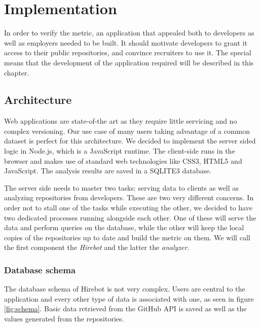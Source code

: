 \chapter{Implementation}\label{ch:implementation}
In order to verify the metric, an application that appealed both to developers as well as employers needed to be built. It should motivate developers to grant it access to their public repositories, and convince recruiters to use it. The special means that the development of the application required will be described in this chapter.

\section{Architecture}
Web applications are state-of-the art as they require little servicing and no complex versioning. Our use case of many users taking advantage of a common dataset is perfect for this architecture. We decided to implement the server sided logic in Node.js, which is a JavaScript runtime. The client-side runs in the browser and makes use of standard web technologies like CSS3, HTML5 and JavaScript. The analysis results are saved in a SQLITE3 database.
\newline

The server side needs to master two tasks: serving data to clients as well as analyzing repositories from developers. These are two very different concerns. In order not to stall one of the tasks while executing the other, we decided to have two dedicated processes running alongside each other. One of these will serve the data and perform queries on the database, while the other will keep the local copies of the repositories up to date and build the metric on them. We will call the first component the \textit{Hirebot} and the latter the \textit{analyzer}.

\subsection{Database schema}
The database schema of Hirebot is not very complex. Users are central to the application and every other type of data is associated with one, as seen in figure \ref{fig:schema}. Basic data retrieved from the GitHub API is saved as well as the values generated from the repositories.

